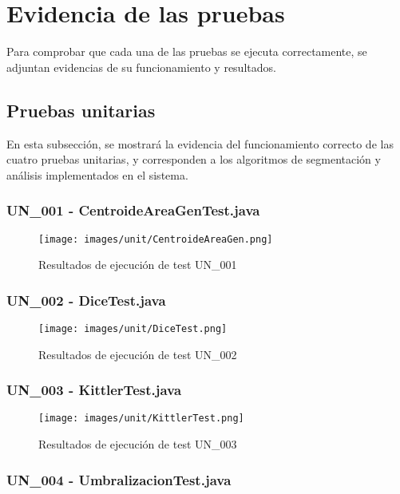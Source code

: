 \documentclass{scrreprt}
\begin{document}
\section{Evidencia de las pruebas}

Para comprobar que cada una de las pruebas se ejecuta correctamente, se adjuntan evidencias de su funcionamiento y resultados.

\subsection{Pruebas unitarias}

En esta subsección, se mostrará la evidencia del funcionamiento correcto de las cuatro pruebas unitarias, y corresponden a los algoritmos de segmentación y análisis implementados en el sistema.

\subsubsection{UN_001 - CentroideAreaGenTest.java}

\begin{figure}[H]
	\centering
    \texttt{[image: images/unit/CentroideAreaGen.png]}
    \caption{Resultados de ejecución de test UN_001}
\end{figure}


\subsubsection{UN_002 - DiceTest.java}

\begin{figure}[H]
	\centering
    \texttt{[image: images/unit/DiceTest.png]}
    \caption{Resultados de ejecución de test UN_002}
\end{figure}


\subsubsection{UN_003 - KittlerTest.java}

\begin{figure}[H]
	\centering
    \texttt{[image: images/unit/KittlerTest.png]}
    \caption{Resultados de ejecución de test UN_003}
\end{figure}


\subsubsection{UN_004 - UmbralizacionTest.java}
\end{document}
